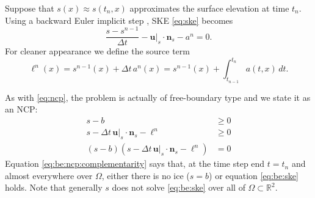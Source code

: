 \documentclass[hidelinks,onefignum,onetabnum,final]{siamart220329}  %
\newcommand{\RR}{\mathbb{R}}
\newcommand{\bn}{\mathbf{n}}
\newcommand{\bu}{\mathbf{u}}
\begin{document}
Suppose that $s(x)\approx s(t_n,x)$ approximates the surface elevation at time $t_n$.  Using a backward Euler implicit step \cite{AscherPetzold1998}, SKE \eqref{eq:ske} becomes
\begin{equation}
\frac{s - s^{n-1}}{\Delta t} - \bu|_{s} \cdot \bn_{s} - a^n = 0. \label{eq:be:ske}
\end{equation}
For cleaner appearance we define the source term
\begin{equation}
\ell^n(x) = s^{n-1}(x)+\Delta t\,a^n(x) = s^{n-1}(x) + \int_{t_{n-1}}^{t_n} a(t,x)\,dt. \label{eq:be:source}
\end{equation}

As with \eqref{eq:ncp}, the problem is actually of free-boundary type and we state it as an NCP:
\begin{subequations}
\label{eq:be:ncp}
\begin{align}
s - b &\ge 0 \label{eq:be:ncp:constraint} \\
s - \Delta t\,\bu|_s \cdot \bn_s - \ell^n &\ge 0 \\
(s - b) \left(s - \Delta t\,\bu|_s \cdot \bn_s - \ell^n\right) &= 0 \label{eq:be:ncp:complementarity}
\end{align}
\end{subequations}
Equation \eqref{eq:be:ncp:complementarity} says that, at the time step end $t=t_n$ and almost everywhere over $\Omega$, either there is no ice ($s=b$) or equation \eqref{eq:be:ske} holds.  Note that generally $s$ does not solve \eqref{eq:be:ske} over all of $\Omega \subset \RR^2$.
\end{document}
